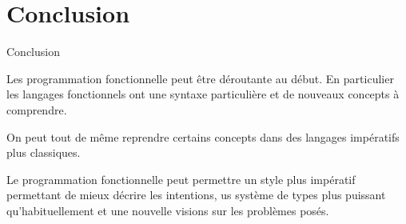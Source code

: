 \documentclass[aspectratio=169]{beamer}
\begin{document}
\section{Conclusion}

\begin{frame}{Conclusion}

Les programmation fonctionnelle peut être déroutante au début. En particulier les langages fonctionnels ont une syntaxe particulière et de nouveaux concepts à comprendre.

On peut tout de même reprendre certains concepts dans des langages impératifs plus classiques.

Le programmation fonctionnelle peut permettre un style plus impératif permettant de mieux décrire les intentions, us système de types plus puissant qu'habituellement et une nouvelle visions sur les problèmes posés.
    
\end{frame}
\end{document}
